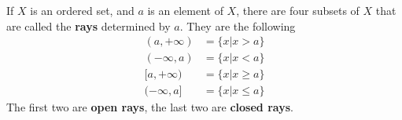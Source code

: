 \begin{defn}\label{defn:rays}
If $X$ is an ordered set, and $a$ is an element of $X$, there are
four subsets of $X$ that are called the \textbf{rays} determined
by $a$. They are the following
\begin{subequations}
\begin{align}
(a,+\infty) &= \{x|x>a\}\\
(-\infty,a) &= \{x|x<a\}\\
[a,+\infty) &= \{x|x\geq a\}\\
(-\infty,a] &= \{x|x\leq a\}
\end{align}
\end{subequations}
The first two are \textbf{open rays}, the last two are
\textbf{closed rays}.
\end{defn}
